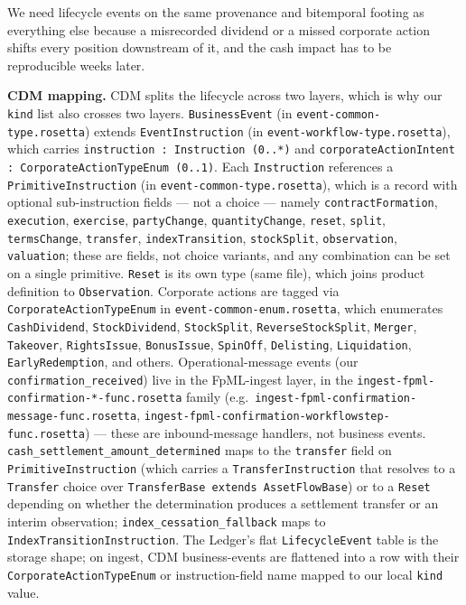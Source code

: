 \documentclass[11pt,a4paper]{article}
\begin{document}
We need lifecycle events on the same provenance and bitemporal footing as everything else because a misrecorded dividend or a missed corporate action shifts every position downstream of it, and the cash impact has to be reproducible weeks later.

\textbf{CDM mapping.} CDM splits the lifecycle across two layers, which is why our \texttt{kind} list also crosses two layers. \texttt{BusinessEvent} (in \texttt{event-common-type.rosetta}) extends \texttt{EventInstruction} (in \texttt{event-workflow-type.rosetta}), which carries \texttt{instruction : Instruction (0..*)} and \texttt{corporateActionIntent : CorporateActionTypeEnum (0..1)}. Each \texttt{Instruction} references a \texttt{PrimitiveInstruction} (in \texttt{event-common-type.rosetta}), which is a record with optional sub-instruction fields --- not a choice --- namely \texttt{contractFormation}, \texttt{execution}, \texttt{exercise}, \texttt{partyChange}, \texttt{quantityChange}, \texttt{reset}, \texttt{split}, \texttt{termsChange}, \texttt{transfer}, \texttt{indexTransition}, \texttt{stockSplit}, \texttt{observation}, \texttt{valuation}; these are fields, not choice variants, and any combination can be set on a single primitive. \texttt{Reset} is its own type (same file), which joins product definition to \texttt{Observation}. Corporate actions are tagged via \texttt{CorporateActionTypeEnum} in \texttt{event-common-enum.rosetta}, which enumerates \texttt{CashDividend}, \texttt{StockDividend}, \texttt{StockSplit}, \texttt{ReverseStockSplit}, \texttt{Merger}, \texttt{Takeover}, \texttt{RightsIssue}, \texttt{BonusIssue}, \texttt{SpinOff}, \texttt{Delisting}, \texttt{Liquidation}, \texttt{EarlyRedemption}, and others. Operational-message events (our \texttt{confirmation\_received}) live in the FpML-ingest layer, in the \texttt{ingest-fpml-confirmation-*-func.rosetta} family (e.g.\ \texttt{ingest-fpml-confirmation-message-func.rosetta}, \texttt{ingest-fpml-confirmation-workflowstep-func.rosetta}) --- these are inbound-message handlers, not business events. \texttt{cash\_settlement\_amount\_determined} maps to the \texttt{transfer} field on \texttt{PrimitiveInstruction} (which carries a \texttt{TransferInstruction} that resolves to a \texttt{Transfer} choice over \texttt{TransferBase extends AssetFlowBase}) or to a \texttt{Reset} depending on whether the determination produces a settlement transfer or an interim observation; \texttt{index\_cessation\_fallback} maps to \texttt{IndexTransitionInstruction}. The Ledger's flat \texttt{LifecycleEvent} table is the storage shape; on ingest, CDM business-events are flattened into a row with their \texttt{CorporateActionTypeEnum} or instruction-field name mapped to our local \texttt{kind} value.
\end{document}
